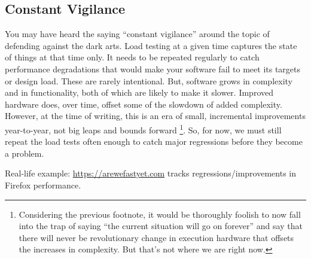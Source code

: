 \subsection*{Constant Vigilance}
You may have heard the saying ``constant vigilance'' around the topic of defending against the dark arts. Load testing at a given time captures the state of things at that time only. It needs to be repeated regularly to catch performance degradations that would make your software fail to meet its targets or design load. These are rarely intentional. But, software grows in complexity and in functionality, both of which are likely to make it slower.  Improved hardware does, over time, offset some of the slowdown of added complexity. However, at the time of writing, this is an era of small, incremental improvements year-to-year, not big leaps and bounds forward \footnote{Considering the previous footnote, it would be thoroughly foolish to now fall into the trap of saying ``the current situation will go on forever'' and say that there will never be revolutionary change in execution hardware that offsets the increases in complexity. But that's not where we are right now.}. So, for now, we must still repeat the load tests often enough to catch major regressions before they become a problem.

Real-life example: \url{https://arewefastyet.com} tracks regressions/improvements in Firefox performance.





